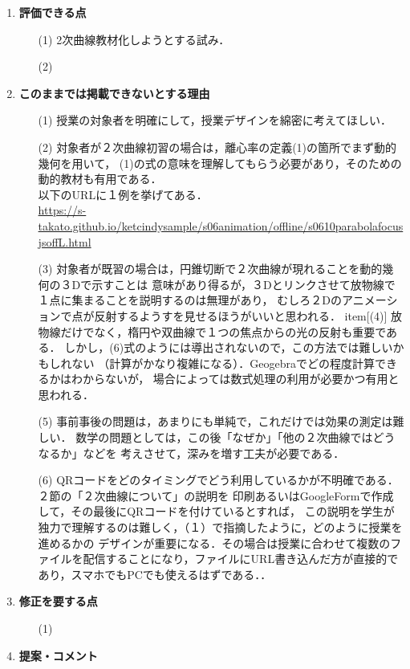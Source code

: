 \documentclass[11pt]{jarticle}
\begin{document}
\begin{enumerate}
\item%
{\bf 評価できる点}
\begin{enumerate}
\item[(1)]%
2次曲線教材化しようとする試み．

\item[(2)]%

\end{enumerate}

\item%
{\bf このままでは掲載できないとする理由}
\begin{enumerate}
\item[(1)]%
授業の対象者を明確にして，授業デザインを綿密に考えてほしい．
\item[(2)]%
対象者が２次曲線初習の場合は，離心率の定義(1)の箇所でまず動的幾何を用いて，
(1)の式の意味を理解してもらう必要があり，そのための動的教材も有用である．\\
以下のURLに１例を挙げてある．\\
{\small
\url{https://s-takato.github.io/ketcindysample/s06animation/offline/s0610parabolafocusjsoffL.html}
}

\item[(3)]%
対象者が既習の場合は，円錐切断で２次曲線が現れることを動的幾何の３Dで示すことは
意味があり得るが，３Dとリンクさせて放物線で１点に集まることを説明するのは無理があり，
むしろ２Dのアニメーションで点が反射するようすを見せるほうがいいと思われる．
item[(4)]%
放物線だけでなく，楕円や双曲線で１つの焦点からの光の反射も重要である．
しかし，(6)式のようには導出されないので，この方法では難しいかもしれない
（計算がかなり複雑になる）．Geogebraでどの程度計算できるかはわからないが，
場合によっては数式処理の利用が必要かつ有用と思われる．
\item[(5)]%
事前事後の問題は，あまりにも単純で，これだけでは効果の測定は難しい．
数学の問題としては，この後「なぜか」「他の２次曲線ではどうなるか」などを
考えさせて，深みを増す工夫が必要である．
\item[(6)]%
QRコードをどのタイミングでどう利用しているかが不明確である．２節の「２次曲線について」の説明を
印刷あるいはGoogleFormで作成して，その最後にQRコードを付けているとすれば，
この説明を学生が独力で理解するのは難しく，（１）で指摘したように，どのように授業を進めるかの
デザインが重要になる．その場合は授業に合わせて複数のファイルを配信することになり，ファイルにURL書き込んだ方が直接的であり，スマホでもPCでも使えるはずである．．

\end{enumerate}

\item%
{\bf 修正を要する点}
\begin{enumerate}
 \item[(1)]%
\end{enumerate}


\item%
{\bf 提案・コメント}



\end{enumerate}
\end{document}
